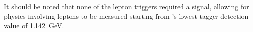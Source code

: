 		It should be noted that none of the lepton triggers required a  signal, allowing for physics involving leptons to be measured starting from 's lowest tagger detection value of 1.142~GeV.
		
%		
%		
%		
%		
		